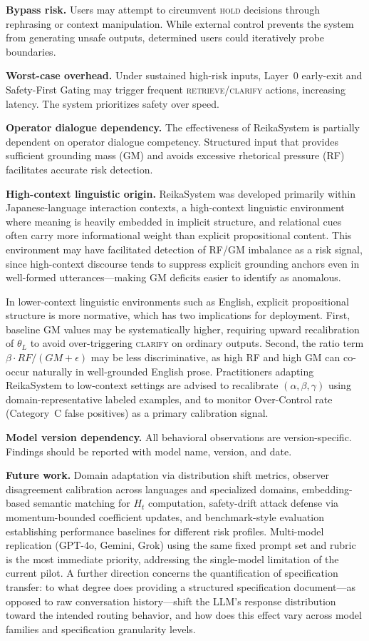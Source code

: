 \documentclass[11pt,a4paper]{article}
\begin{document}
\textbf{Bypass risk.} Users may attempt to circumvent \textsc{hold} decisions through
rephrasing or context manipulation. While external control prevents the system from
generating unsafe outputs, determined users could iteratively probe boundaries.

\textbf{Worst-case overhead.} Under sustained high-risk inputs, Layer~0 early-exit and
Safety-First Gating may trigger frequent \textsc{retrieve}/\textsc{clarify} actions,
increasing latency. The system prioritizes safety over speed.

\textbf{Operator dialogue dependency.} The effectiveness of ReikaSystem is partially
dependent on operator dialogue competency. Structured input that provides sufficient
grounding mass (GM) and avoids excessive rhetorical pressure (RF) facilitates accurate
risk detection.

\textbf{High-context linguistic origin.} ReikaSystem was developed primarily within
Japanese-language interaction contexts, a high-context linguistic environment where meaning
is heavily embedded in implicit structure, and relational cues often carry more informational
weight than explicit propositional content. This environment may have facilitated detection
of RF/GM imbalance as a risk signal, since high-context discourse tends to suppress
explicit grounding anchors even in well-formed utterances---making GM deficits easier
to identify as anomalous.

In lower-context linguistic environments such as English, explicit propositional structure
is more normative, which has two implications for deployment. First, baseline GM values
may be systematically higher, requiring upward recalibration of $\theta_L$ to avoid
over-triggering \textsc{clarify} on ordinary outputs. Second, the ratio term
$\beta \cdot RF/(GM+\epsilon)$ may be less discriminative, as high RF and high GM
can co-occur naturally in well-grounded English prose. Practitioners adapting
ReikaSystem to low-context settings are advised to recalibrate $(\alpha, \beta, \gamma)$
using domain-representative labeled examples, and to monitor Over-Control rate
(Category~C false positives) as a primary calibration signal.

\textbf{Model version dependency.} All behavioral observations are version-specific.
Findings should be reported with model name, version, and date.

\textbf{Future work.} Domain adaptation via distribution shift metrics, observer disagreement
calibration across languages and specialized domains, embedding-based semantic matching for
$H_t$ computation, safety-drift attack defense via momentum-bounded coefficient updates,
and benchmark-style evaluation establishing performance baselines for different risk profiles.
Multi-model replication (GPT-4o, Gemini, Grok) using the same fixed prompt set and rubric
is the most immediate priority, addressing the single-model limitation of the current pilot.
A further direction concerns the quantification of specification transfer: to what degree does
providing a structured specification document---as opposed to raw conversation history---shift
the LLM's response distribution toward the intended routing behavior, and how does this effect
vary across model families and specification granularity levels.
\end{document}
